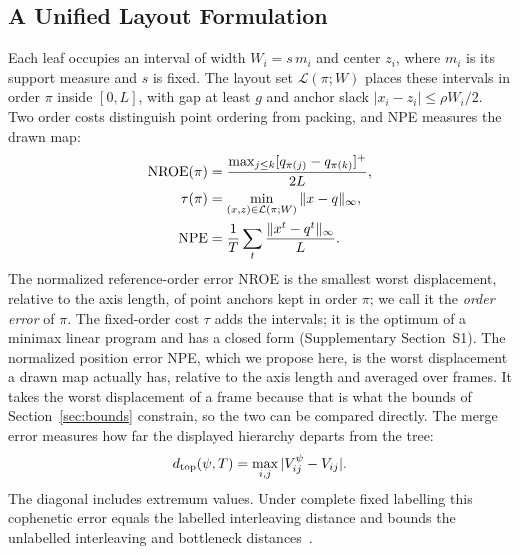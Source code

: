 \subsection{A Unified Layout Formulation}\label{sec:common}
Each leaf occupies an interval of width $W_i=s\,m_i$ and center $z_i$, where $m_i$ is its support measure and $s$ is fixed. The layout set $\mathcal{L}(\pi;W)$ places these intervals in order $\pi$ inside $[0,L]$, with gap at least $g$ and anchor slack $|x_i-z_i|\le\rho W_i/2$. Two order costs distinguish point ordering from packing, and NPE measures the drawn map:
\begin{equation}\label{eq:nroe}
\begin{aligned}
\mathrm{NROE}(\pi)&=\frac{\max_{j\le k}[q_{\pi(j)}-q_{\pi(k)}]^+}{2L},\\
\tau(\pi)&=\min_{(x,z)\in\mathcal{L}(\pi;W)}\|x-q\|_\infty ,\\
\mathrm{NPE}&=\frac1T\sum_{t}\frac{\|x^t-q^t\|_\infty}{L}.
\end{aligned}
\end{equation}
The normalized reference-order error NROE is the smallest worst displacement, relative to the axis length, of point anchors kept in order $\pi$; we call it the \emph{order error} of $\pi$. The fixed-order cost $\tau$ adds the intervals; it is the optimum of a minimax linear program and has a closed form (Supplementary Section~S1). The normalized position error NPE, which we propose here, is the worst displacement a drawn map actually has, relative to the axis length and averaged over frames. It takes the worst displacement of a frame because that is what the bounds of Section~\ref{sec:bounds} constrain, so the two can be compared directly. The merge error measures how far the displayed hierarchy departs from the tree:
\begin{equation}\label{eq:dtop}
d_{\mathrm{top}}(\psi,T)=\max_{i,j}|V_{ij}^{\psi}-V_{ij}|.
\end{equation}
The diagonal includes extremum values. Under complete fixed labelling this cophenetic error equals the labelled interleaving distance and bounds the unlabelled interleaving and bottleneck distances~\cite{Munch:2019:LINF,Gasparovic:2024:IID,Morozov:2013:IDMT}.


